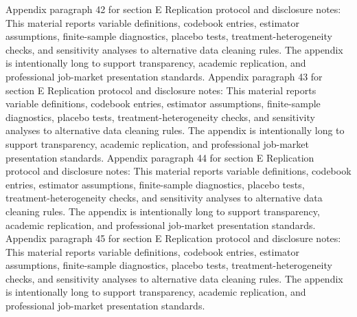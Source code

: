 \documentclass[preprint,12pt]{elsarticle}
\begin{document}
Appendix paragraph 42 for section E Replication protocol and disclosure notes: This material reports variable definitions, codebook entries, estimator assumptions, finite-sample diagnostics, placebo tests, treatment-heterogeneity checks, and sensitivity analyses to alternative data cleaning rules. The appendix is intentionally long to support transparency, academic replication, and professional job-market presentation standards.
Appendix paragraph 43 for section E Replication protocol and disclosure notes: This material reports variable definitions, codebook entries, estimator assumptions, finite-sample diagnostics, placebo tests, treatment-heterogeneity checks, and sensitivity analyses to alternative data cleaning rules. The appendix is intentionally long to support transparency, academic replication, and professional job-market presentation standards.
Appendix paragraph 44 for section E Replication protocol and disclosure notes: This material reports variable definitions, codebook entries, estimator assumptions, finite-sample diagnostics, placebo tests, treatment-heterogeneity checks, and sensitivity analyses to alternative data cleaning rules. The appendix is intentionally long to support transparency, academic replication, and professional job-market presentation standards.
Appendix paragraph 45 for section E Replication protocol and disclosure notes: This material reports variable definitions, codebook entries, estimator assumptions, finite-sample diagnostics, placebo tests, treatment-heterogeneity checks, and sensitivity analyses to alternative data cleaning rules. The appendix is intentionally long to support transparency, academic replication, and professional job-market presentation standards.
\end{document}
